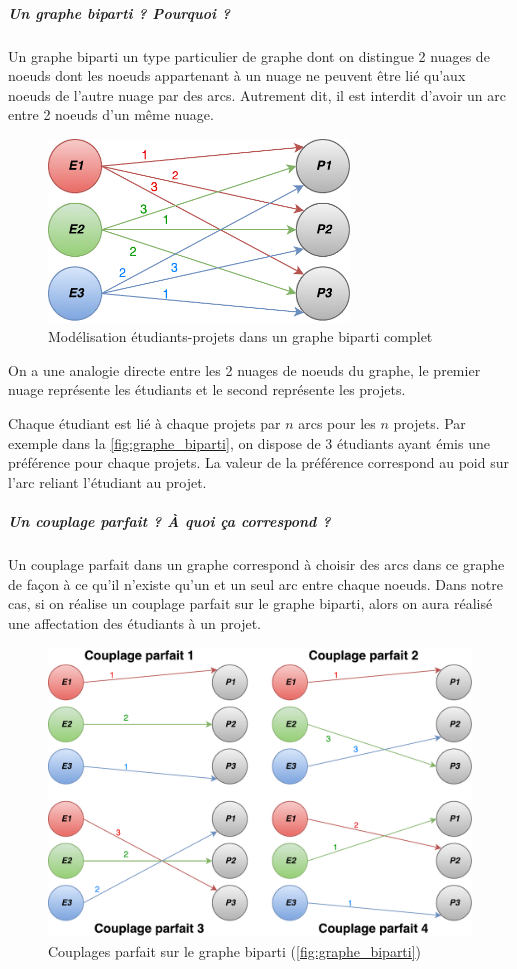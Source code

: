 \documentclass[final,poster]{polytech/polytech}
\begin{document}
\subparagraph{Un graphe biparti ? Pourquoi ?}
Un graphe biparti un type particulier de graphe dont on distingue 2 nuages de noeuds dont les noeuds appartenant à un nuage ne peuvent être lié qu'aux noeuds de l'autre nuage par des arcs. 
Autrement dit, il est interdit d'avoir un arc entre 2 noeuds d'un même nuage.

\begin{figure}[htbp]
\includegraphics[width=8cm]{images/Graphe_bipartie}
\caption{\label{fig:graphe_biparti}Modélisation étudiants-projets dans un graphe biparti complet}
\end{figure}

On a une analogie directe entre les 2 nuages de noeuds du graphe, le premier nuage représente les étudiants et le second représente les projets.

Chaque étudiant est lié à chaque projets par $n$ arcs pour les $n$ projets. Par exemple dans la \autoref{fig:graphe_biparti}, on dispose de 3 étudiants ayant émis une préférence pour chaque projets. La valeur de la préférence correspond au poid sur l'arc reliant l'étudiant au projet.

\subparagraph{Un couplage parfait ? \`A quoi ça correspond ?}

Un couplage parfait dans un graphe correspond à choisir des arcs dans ce graphe de façon à ce qu'il n'existe qu'un et un seul arc entre chaque noeuds.
Dans notre cas, si on réalise un couplage parfait sur le graphe biparti, alors on aura réalisé une affectation des étudiants à un projet. 

\begin{figure}[htbp]
\includegraphics[width=12cm]{images/graphe_biparti_couplage_parfait}
\caption{\label{fig:graphe_biparti_couplage_parfait}Couplages parfait sur le graphe biparti (\autoref{fig:graphe_biparti})}
\end{figure}
\end{document}
